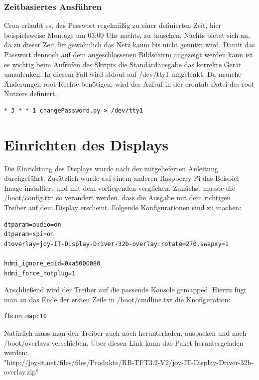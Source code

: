 \documentclass[a4paper,11pt,singlespacing]{article}
\begin{document}
    		\subsubsection{Zeitbasiertes Ausführen}
    			Cron erlaubt es, das Passwort regelmäßig zu einer definierten Zeit, hier beispielsweise Montags um 03:00 Uhr nachts, zu tauschen. Nachts bietet sich an, da zu dieser Zeit für gewöhnlich das Netz kaum bis nicht genutzt wird. Damit das Passwort dennoch auf dem angeschlossenen Bildschirm angezeigt werden kann ist es wichtig beim Aufrufen des Skripts die Standardausgabe das korrekte Gerät umzulenken. In diesem Fall wird stdout auf /dev/tty1 umgelenkt. Da manche Änderungen root-Rechte benötigen, wird der Aufruf in der crontab Datei des root Nutzers definiert.
    			\begin{lstlisting}
* 3 * * 1 changePassword.py > /dev/tty1
    			\end{lstlisting}
    		
    \section{Einrichten des Displays}
    		Die Einrichtung des Displays wurde nach der mitgelieferten Anleitung durchgeführt. \cite{Quote_display_manual} Zusätzlich wurde auf einem anderen Raspberry Pi das Beispiel Image installiert und mit dem vorliegenden verglichen. Zunächst musste die /boot/config.txt so verändert werden, dass die Ausgabe mit dem richtigen Treiber auf dem Display erscheint. Folgende Konfigurationen sind zu machen:
    		\begin{lstlisting}
dtparam=audio=on
dtparam=spi=on
dtoverlay=joy-IT-Display-Driver-32b-overlay:rotate=270,swapxy=1

hdmi_ignore_edid=0xa5000080
hdmi_force_hotplug=1
    		\end{lstlisting}
    		
    		Anschließend wird der Treiber auf die passende Konsole gemapped. Hierzu fügt man an das Ende der ersten Zeile in /boot/cmdline.txt die Knofiguration:
    		\begin{lstlisting}
fbcon=map:10
    		\end{lstlisting}

			Natürlich muss man den Treiber auch noch herunterladen, auspacken und nach /boot/overlays verschieben. Über diesen Link kann das Paket heruntergeladen werden:\\
			
			"http://joy-it.net/files/files/Produkte/RB-TFT3.2-V2/joy-IT-Display-Driver-32b-overlay.zip" \\
\end{document}
